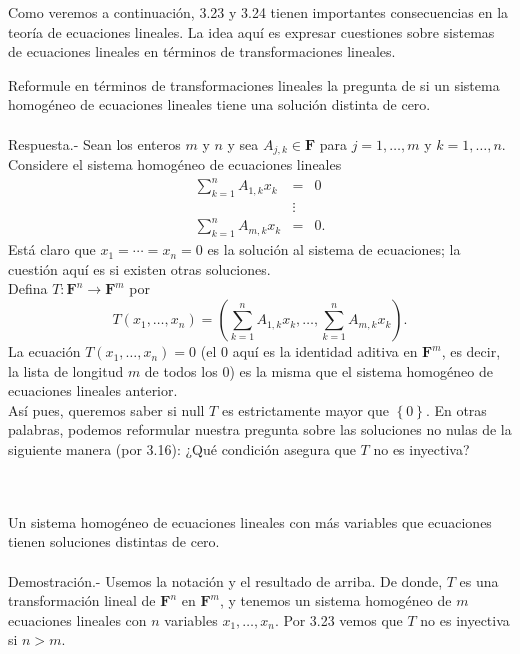 Como veremos a continuación, 3.23 y 3.24 tienen importantes consecuencias en la teoría de ecuaciones lineales. La idea aquí es expresar cuestiones sobre sistemas de ecuaciones lineales en términos de transformaciones lineales.

\begin{myejem}
    Reformule en términos de transformaciones lineales la pregunta de si un sistema homogéneo de ecuaciones lineales tiene una solución distinta de cero.\\\\
	Respuesta.-\; Sean los enteros $m$ y $n$ y sea $A_{j,k}\in \textbf{F}$ para $j=1,\ldots,m$ y $k=1,\ldots,n$. Considere el sistema homogéneo de ecuaciones lineales
	$$
	\begin{array}{rcl}
	    \displaystyle\sum_{k=1}^n A_{1,k}x_k &=& 0\\
						 &\vdots&\\
	     \displaystyle\sum_{k=1}^n A_{m,k}x_k &=& 0.
	\end{array}
	$$
	Está claro que $x_1=\cdots=x_n=0$ es la solución al sistema de ecuaciones; la cuestión aquí es si existen otras soluciones.\\

	Defina $T:\textbf{F}^n \to \textbf{F}^m$ por
	$$T(x_1,\ldots,x_n)=\left(\sum_{k=1}^n A_{1,k}x_k,\ldots,\sum_{k=1}^n A_{m,k}x_k\right).$$
	La ecuación $T(x_1,\ldots, x_n)=0$ (el $0$ aquí es la identidad aditiva en $\textbf{F}^m$, es decir, la lista de longitud $m$ de todos los $0$) es la misma que el sistema homogéneo de ecuaciones lineales anterior.\\
	Así pues, queremos saber si null $T$ es estrictamente mayor que $\left\{0\right\}$. En otras palabras, podemos reformular nuestra pregunta sobre las soluciones no nulas de la siguiente manera (por 3.16): ¿Qué condición asegura que $T$ no es inyectiva?
\end{myejem}

\begin{myteo}\,\\\\
    Un sistema homogéneo de ecuaciones lineales con más variables que ecuaciones tienen soluciones distintas de cero.\\\\
	Demostración.-\; Usemos la notación y el resultado de arriba. De donde, $T$ es una transformación lineal de $\textbf{F}^n$ en $\textbf{F}^m$, y tenemos un sistema homogéneo de $m$ ecuaciones lineales con $n$ variables $x_1,\ldots,x_n$. Por 3.23 vemos que $T$ no es inyectiva si $n>m$.
\end{myteo}

